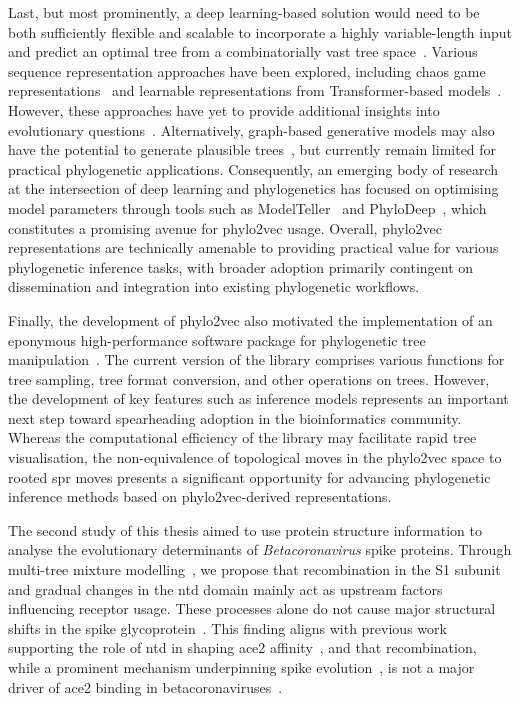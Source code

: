 Last, but most prominently, a deep learning-based solution would need to be both sufficiently flexible and scalable to incorporate a highly variable-length input and predict an optimal tree from a combinatorially vast tree space~\cite{sapoval2022}. Various sequence representation approaches have been explored, including chaos game representations~\cite{jeffrey1990} and learnable representations from Transformer-based models~\cite{consens2025}. However, these approaches have yet to provide additional insights into evolutionary questions~\cite{ektefaie2025}. Alternatively, graph-based generative models may also have the potential to generate plausible trees~\cite{xie2023b, xie2025}, but currently remain limited for practical phylogenetic applications. Consequently, an emerging body of research at the intersection of deep learning and phylogenetics has focused on optimising model parameters through tools such as ModelTeller~\cite{abadi2020} and PhyloDeep~\cite{voznica2022}, which constitutes a promising avenue for phylo2vec usage. Overall, phylo2vec representations are technically amenable to providing practical value for various phylogenetic inference tasks, with broader adoption primarily contingent on dissemination and integration into existing phylogenetic workflows. %

Finally, the development of phylo2vec also motivated the implementation of an eponymous high-performance software package for phylogenetic tree manipulation~\cite{scheidwasser2025}. The current version of the library comprises various functions for tree sampling, tree format conversion, and other operations on trees. However, the development of key features such as inference models represents an important next step toward spearheading adoption in the bioinformatics community. Whereas the computational efficiency of the library may facilitate rapid tree visualisation, the non-equivalence of topological moves in the phylo2vec space to rooted \gls{spr} moves presents a significant opportunity for advancing phylogenetic inference methods based on phylo2vec-derived representations.

The second study of this thesis aimed to use protein structure information to analyse the evolutionary determinants of \textit{Betacoronavirus} spike proteins. Through multi-tree mixture modelling~\cite{wong2024}, we propose that recombination in the S1 subunit and gradual changes in the \gls{ntd} domain mainly act as upstream factors influencing receptor usage. These processes alone do not cause major structural shifts in the spike glycoprotein~\cite{scheidwasser2025a}. This finding aligns with previous work supporting the role of \gls{ntd} in shaping \gls{ace2} affinity~\cite{meng2022}, and that recombination, while a prominent mechanism underpinning spike evolution~\cite{li2020}, is not a major driver of \gls{ace2} binding in betacoronaviruses~\cite{wrobel2021, boni2020, wells2023, starr2022}.


